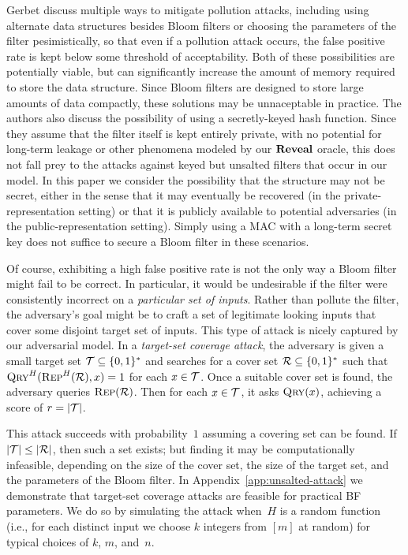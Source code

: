 Gerbet \etal discuss multiple ways to mitigate pollution attacks, including
using alternate data structures besides Bloom filters or choosing the parameters
of the filter pesimistically, so that even if a pollution attack occurs, the
false positive rate is kept below some threshold of acceptability. Both of these
possibilities are potentially viable, but can significantly increase the amount
of memory required to store the data structure. Since Bloom filters are designed
to store large amounts of data compactly, these solutions may be unnaceptable in
practice. The authors also discuss the possibility of using a secretly-keyed
hash function. Since they assume that the filter itself is kept entirely
private, with no potential for long-term leakage or other phenomena modeled by
our $\mathbf{Reveal}$ oracle, this does not fall prey to the attacks against keyed but
unsalted filters that occur in our model. In this paper we consider the
possibility that the structure may not be secret, either in the sense that it
may eventually be recovered (in the private-representation setting) or that it
is publicly available to potential adversaries (in the public-representation
setting). Simply using a MAC with a long-term secret key does not suffice to
secure a Bloom filter in these scenarios.

%
Of course, exhibiting a high false positive rate is not the only way a Bloom
filter might fail to be correct. In particular, it would be undesirable if the
filter were consistently incorrect on a \emph{particular set of inputs}. Rather
than pollute the filter, the adversary's goal might be to craft a set of
legitimate looking inputs that cover some disjoint target set of inputs.
%
This type of attack is nicely captured by our adversarial model.
%
In a \emph{target-set coverage attack}, the adversary is given a small target set
$\mathcal{T}\subseteq\{0,1\}^*$ and searches for a cover set $\mathcal{R}\subseteq\{0,1\}^*$
such that $\textnormal{\textsc{Qry}}^H(\textnormal{\textsc{Rep}}^H(\mathcal{R}),x)=1$ for each $x\in\mathcal{T}$.
%
Once a suitable cover set is found, the adversary queries $\textnormal{\textsc{Rep}}(\mathcal{R})$. Then
for each $x\in\mathcal{T}$, it asks $\textnormal{\textsc{Qry}}(x)$, achieving a score of $r = |\mathcal{T}|$.

This  attack succeeds with probability~$1$ assuming a covering set can
be found.  If $|\mathcal{T}| \leq |\mathcal{R}|$, then such a set exists; but finding it may be
computationally infeasible, depending on the size of the cover set, the size of
the target set, and the parameters of the Bloom filter.
%
In Appendix~\ref{app:unsalted-attack} we demonstrate that target-set coverage
attacks are feasible for practical BF parameters. We do so by simulating the
attack when~$H$ is a random function (i.e., for each distinct input we choose
$k$ integers from $[m]$ at random) for typical choices of $k$, $m$, and~$n$.
%

